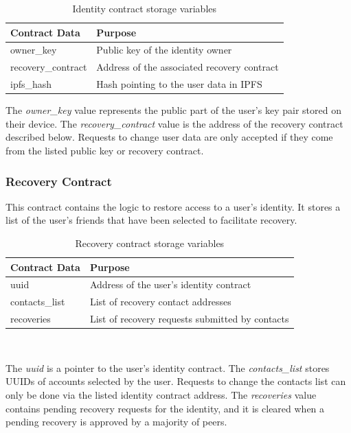 \begin{table}[h]
	\centering
    \begin{tabular}{|p{3cm}|p{8cm}|}
        \hline \textbf{Contract Data} & \textbf{Purpose} \\
        \hline owner\_key & Public key of the identity owner \\
        \hline recovery\_contract & Address of the associated recovery contract \\
        \hline ipfs\_hash & Hash pointing to the user data in \ac{IPFS} \\
        \hline
    \end{tabular}
    \caption{Identity contract storage variables}
    \label{tab:identity-contract}   
\end{table}

The \textit{owner\_key} value represents the public part of the user's key pair stored on their device. The \textit{recovery\_contract} value is the address of the recovery contract described below. Requests to change user data are only accepted if they come from the listed public key or recovery contract.

\subsubsection{Recovery Contract}
This contract contains the logic to restore access to a user's identity. It stores a list of the user's friends that have been selected to facilitate recovery.

\begin{table}[h]
	\centering
    \begin{tabular}{|p{2.5cm}|p{9cm}|}
        \hline \textbf{Contract Data} & \textbf{Purpose} \\
     	\hline uuid & Address of the user's identity contract \\
     	\hline contacts\_list & List of recovery contact addresses \\
    	\hline recoveries & List of recovery requests submitted by contacts \\
     	\hline
    \end{tabular} \\
    \caption{Recovery contract storage variables}
    \label{tab:recovery-contract}   
\end{table}

The \textit{uuid} is a pointer to the user's identity contract. The \textit{contacts\_list} stores \acp{UUID} of accounts selected by the user. Requests to change the contacts list can only be done via the listed identity contract address. The \textit{recoveries} value contains pending recovery requests for the identity, and it is cleared when a pending recovery is approved by a majority of peers.


